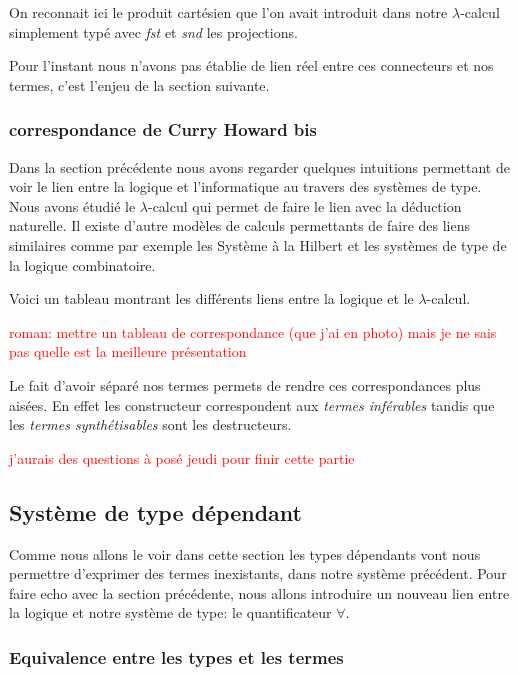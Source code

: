 \documentclass {article}
\theoremstyle{definition}
\theoremstyle{remark}
\newcommand{\todo}[1]{\textcolor{red}{#1}}
\begin{document}
On reconnait ici le produit cartésien que l'on avait introduit dans notre $\lambda$-calcul simplement typé avec \emph{fst}
et \emph{snd} les projections.


Pour l'instant nous n'avons pas établie de lien réel entre ces connecteurs et nos termes, c'est l'enjeu de la
section suivante.

\subsubsection{correspondance de Curry Howard bis}

Dans la section précédente nous avons regarder quelques intuitions permettant de voir le lien entre la logique
et l'informatique au travers des systèmes de type.
Nous avons étudié le $\lambda$-calcul qui permet de faire le lien avec la déduction naturelle. Il existe d'autre
modèles de calculs permettants de faire des liens similaires comme par exemple les Système à la Hilbert et 
les systèmes de type de la logique combinatoire.

Voici un tableau montrant les différents liens entre la logique et le $\lambda$-calcul.

\todo{roman: mettre un tableau de correspondance (que j'ai en photo) mais je ne sais pas quelle est la meilleure présentation}


Le fait d'avoir séparé nos termes permets de rendre ces correspondances plus aisées. En effet les constructeur
correspondent aux \emph{termes inférables} tandis que les \emph{termes synthétisables} sont les destructeurs.

\todo{j'aurais des questions à posé jeudi pour finir cette partie}









\subsection{Système de type dépendant}

Comme nous allons le voir dans cette section les types dépendants vont nous permettre d'exprimer 
des termes inexistants, dans notre système précédent. Pour faire echo avec la section précédente,
nous allons introduire un nouveau lien entre la logique et notre système de type: le quantificateur $\forall$.

\subsubsection{Equivalence entre les types et les termes}
\label{presentation_type_dependants}
\end{document}
